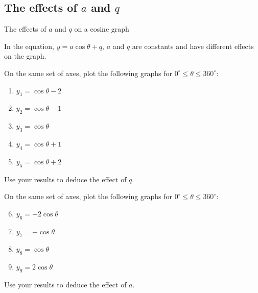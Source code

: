 \subsection*{The effects of $a$ and $q$}
\begin{Investigation}{The effects of $a$ and $q$ on a cosine graph}
{In the equation, $y=a\cos\theta+q$, $a$ and $q$ are constants and have different effects on the graph.

On the same set of axes, plot the following graphs for $0^{\circ} \leq \theta \leq 360^{\circ}$:
\begin{enumerate}[noitemsep, label=\textbf{\arabic*}. ] 
\item $y_1=\cos\theta -2$
\item $y_2=\cos\theta -1$
\item $y_3=\cos\theta $
\item $y_4=\cos\theta +1$
\item $y_5=\cos\theta +2$
\end{enumerate}
Use your results to deduce the effect of $q$.
\par
On the same set of axes, plot the following graphs for $0^{\circ} \leq \theta \leq 360^{\circ}$:
\begin{enumerate}[noitemsep, label=\textbf{\arabic*}. ] 
\setcounter{enumi}{5}
\item $y_6=-2\cos\theta $
\item $y_7=-\cos\theta $
\item $y_8=\cos\theta $
\item $y_9=2\cos\theta $\end{enumerate}
Use your results to deduce the effect of $a$.
}
\end{Investigation}

